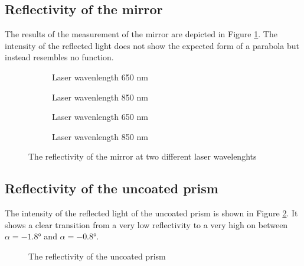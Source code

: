 \documentclass[twoside,english,headsepline=on,DIV=12]{scrartcl}
\numberwithin{equation}{section}
\begin{document}
\subsection{Reflectivity of the mirror}
The results of the measurement of the mirror are depicted in Figure \ref{fig:mirror}. The intensity of the reflected light does not show the expected form of a parabola but instead resembles no function. 
\begin{figure}
	\begin{subfigure}{.48\textwidth}
		
		\caption{Laser wavenlength 650 nm}
	\end{subfigure}
	\begin{subfigure}{.48\textwidth}
		
		\caption{Laser wavenlength 850 nm}
	\end{subfigure}
	\begin{subfigure}{.48\textwidth}
		
		\caption{Laser wavenlength 650 nm}
	\end{subfigure}
	\begin{subfigure}{.48\textwidth}
		
		\caption{Laser wavenlength 850 nm}
	\end{subfigure}
	\caption{The reflectivity of the mirror at two different laser wavelenghts}
	\label{fig:mirror}
\end{figure}
\subsection{Reflectivity of the uncoated prism}
The intensity of the reflected light of the uncoated prism is shown in Figure \ref{fig:uncoated}. It shows a clear transition from a very low reflectivity to a very high on between $\alpha = -1.8°$ and $\alpha = -0.8°$.
\begin{figure}
	
	\caption{The reflectivity of the uncoated prism}
	\label{fig:uncoated}
\end{figure}
\end{document}
